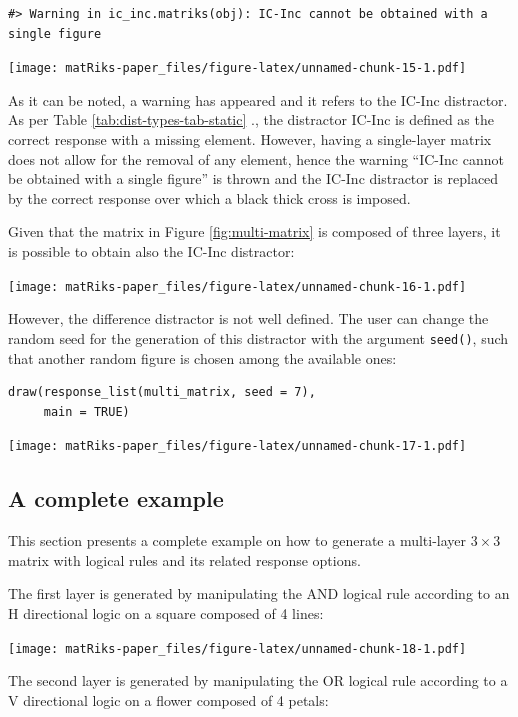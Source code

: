 \begin{verbatim}
#> Warning in ic_inc.matriks(obj): IC-Inc cannot be obtained with a single figure
\end{verbatim}

\texttt{[image: matRiks-paper\_files/figure-latex/unnamed-chunk-15-1.pdf]}

As it can be noted, a warning has appeared and it refers to the IC-Inc distractor.
As per Table \ref{tab:dist-types-tab-static} ., the distractor IC-Inc is defined as the correct response with a missing element.
However, having a single-layer matrix does not allow for the removal of any element, hence the warning ``IC-Inc cannot be obtained with a single figure'' is thrown and the IC-Inc distractor is replaced by the correct response over which a black thick cross is imposed.

Given that the matrix in Figure \ref{fig:multi-matrix} is composed of three layers, it is possible to obtain also the IC-Inc distractor:

\texttt{[image: matRiks-paper\_files/figure-latex/unnamed-chunk-16-1.pdf]}

However, the difference distractor is not well defined.
The user can change the random seed for the generation of this distractor with the argument \texttt{seed()}, such that another random figure is chosen among the available ones:

\begin{verbatim}
draw(response_list(multi_matrix, seed = 7), 
     main = TRUE)
\end{verbatim}

\texttt{[image: matRiks-paper\_files/figure-latex/unnamed-chunk-17-1.pdf]}

\subsection{A complete example}\label{a-complete-example}

This section presents a complete example on how to generate a multi-layer \(3 \times 3\) matrix with logical rules and its related response options.

The first layer is generated by manipulating the AND logical rule according to an H directional logic on a square composed of 4 lines:

\texttt{[image: matRiks-paper\_files/figure-latex/unnamed-chunk-18-1.pdf]}

The second layer is generated by manipulating the OR logical rule according to a V directional logic on a flower composed of 4 petals:

